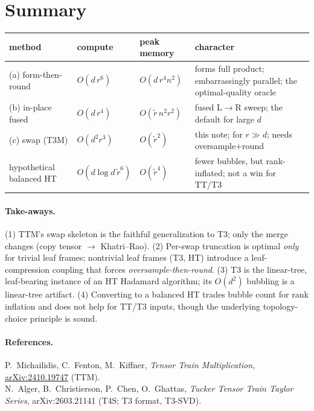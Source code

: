 \documentclass[11pt]{article}
\newcommand{\rtil}{\tilde{r}}
\begin{document}
\section{Summary}

\begin{center}
\begin{tabular}{lllp{4.6cm}}
\toprule
method & compute & peak memory & character \\
\midrule
(a) form-then-round & $O(d\,r^6)$ & $O(d\,r^4 n^2)$ & forms full product; embarrassingly parallel; the optimal-quality oracle \\
(b) in-place fused  & $O(d\,r^4)$ & $O(\rtil\,n^2 r^2)$ & fused L$\to$R sweep; the default for large $d$ \\
(c) swap (T3M)      & $O(d^2 r^3)$ & $O(\rtil^2)$ & this note; for $r\gg d$; needs oversample$+$round \\
\midrule
hypothetical balanced HT & $O(d\log d\,\rtil^6)$ & $O(\rtil^4)$ & fewer bubbles, but rank-inflated; not a win for TT/T3 \\
\bottomrule
\end{tabular}
\end{center}

\paragraph{Take-aways.}
(1) TTM's swap skeleton is the faithful generalization to T3; only the merge changes
(copy tensor $\to$ Khatri--Rao). (2) Per-swap truncation is optimal \emph{only} for
trivial leaf frames; nontrivial leaf frames (T3, HT) introduce a leaf-compression
coupling that forces \emph{oversample-then-round}. (3) T3 is the linear-tree,
leaf-bearing instance of an HT Hadamard algorithm; its $O(d^2)$ bubbling is a
linear-tree artifact. (4) Converting to a balanced HT trades bubble count for rank
inflation and does not help for TT/T3 inputs, though the underlying
topology-choice principle is sound.

\paragraph{References.}
P.\ Michailidis, C.\ Fenton, M.\ Kiffner, \emph{Tensor Train Multiplication},
\href{https://arxiv.org/abs/2410.19747}{arXiv:2410.19747} (TTM).\\
N.\ Alger, B.\ Christierson, P.\ Chen, O.\ Ghattas, \emph{Tucker Tensor Train
Taylor Series}, arXiv:2603.21141 (T4S; T3 format, T3-SVD).
\end{document}
